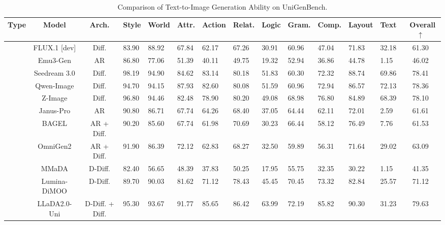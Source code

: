 \begin{table}[!tb]
\centering
\renewcommand{\arraystretch}{1.2}
\setlength\tabcolsep{1pt}
\small
{}

\caption{Comparison of Text-to-Image Generation Ability on UniGenBench.}
\begin{tabularx}{\linewidth}{ccc|*{10}{C}|c} 
\toprule
\textbf{Type} & \textbf{Model} & \textbf{Arch.} & \textbf{Style} & \textbf{World} & \textbf{Attr.} & \textbf{Action} & \textbf{Relat.} & \textbf{Logic} & \textbf{Gram.} & \textbf{Comp.} & \textbf{Layout} & \textbf{Text} & \textbf{~Overall$\uparrow$} \\
\midrule
{} 
&FLUX.1 [dev] & Diff. & 83.90 & 88.92 & 67.84 & 62.17 & 67.26 & 30.91 & 60.96 & 47.04 & 71.83 & 32.18 &61.30   \\

&Emu3-Gen & AR   & 86.80 & 77.06 & 51.39 & 40.11 & 49.75 & 19.32 & 52.94 & 36.86 & 44.78 &  1.15 &46.02 \\

&Seedream 3.0 &Diff. &98.19 &94.90 &84.62 &83.14 &80.18 &51.83 &60.30 &72.32 &88.74 &69.86 &78.41\\

&Qwen-Image & Diff. &94.70 &94.15 &87.93 &82.60 &80.08 &51.59 &60.96 &72.94 &86.57 &72.13 &78.36\\

&Z-Image & Diff. &96.80 &94.46 &82.48 &78.90 &80.20 &49.08 &68.98 &76.80 &84.89 &68.39 &78.10\\


\midrule
{} 
&Janus-Pro & AR & 90.80 & 86.71 & 67.74 & 64.26 & 68.40 & 37.05 & 64.44 & 62.11 & 72.01 &  2.59 &61.61   \\

&BAGEL &AR + Diff. & 90.20 & 85.60 & 67.74 & 61.98 & 70.69 & 30.23 & 66.44 & 58.12 & 76.49 &  7.76 &  61.53  \\

&OmniGen2 & AR + Diff. &91.90 &86.39 &72.12 &62.83 &68.27 &32.50 &59.89 &56.31 &71.64 &29.02 &63.09\\

&MMaDA & D-Diff. &82.40 &56.65 &48.39 &37.83 &50.25 &17.95 &55.75 &32.35 &30.22 &1.15 &41.35\\

&Lumina-DiMOO & D-Diff. &89.70 &90.03 &81.62 &71.12 &78.43 &45.45 &70.45 &73.32 &82.84 &25.57 &71.12\\

&LLaDA2.0-Uni & D-Diff. + Diff. &95.30  &93.67 &91.77 &85.65 &86.42 &63.99 &72.19 &85.82 &90.30 &31.23 &79.63\\
\bottomrule
\end{tabularx}
\label{table:unigen}
\vspace{-0.08in}
\end{table}
